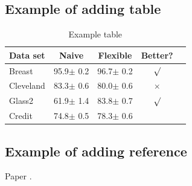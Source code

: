 \documentclass{article}
\begin{document}
\subsection{Example of adding table}

\begin{table}[h]
\caption{Example table}
\label{sample-table}
\vskip 0.15in
\begin{center}
\begin{small}
\begin{sc}
\begin{tabular}{lcccr}
\toprule
Data set & Naive & Flexible & Better? \\
\midrule
Breast    & 95.9$\pm$ 0.2& 96.7$\pm$ 0.2& $\surd$ \\
Cleveland & 83.3$\pm$ 0.6& 80.0$\pm$ 0.6& $\times$\\
Glass2    & 61.9$\pm$ 1.4& 83.8$\pm$ 0.7& $\surd$ \\
Credit    & 74.8$\pm$ 0.5& 78.3$\pm$ 0.6&         \\
\bottomrule
\end{tabular}
\end{sc}
\end{small}
\end{center}
\vskip -0.1in
\end{table}


\subsection{Example of adding reference}

Paper \cite{example}.




\end{document}
